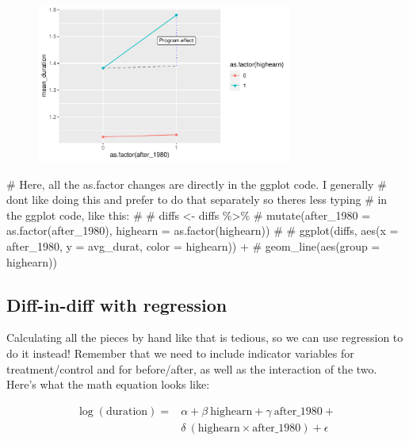 \documentclass[
  letterpaper,
  DIV=11,
  numbers=noendperiod]{scrartcl}
\newenvironment{Shaded}{\begin{snugshade}}{\end{snugshade}}
\newcommand{\CommentTok}[1]{\textcolor[rgb]{0.37,0.37,0.37}{#1}}
\begin{document}
\begin{figure}[H]

{\centering \includegraphics[width=0.75\textwidth,height=\textheight]{DD_wooldridge_injury_files/figure-pdf/nice-diff-diff-plot-1.pdf}

}

\end{figure}

\begin{Shaded}
\begin{Highlighting}[]

\CommentTok{\# Here, all the as.factor changes are directly in the ggplot code. I generally}
\CommentTok{\# don\textquotesingle{}t like doing this and prefer to do that separately so there\textquotesingle{}s less typing}
\CommentTok{\# in the ggplot code, like this:}
\CommentTok{\#}
\CommentTok{\# diffs \textless{}{-} diffs \%\textgreater{}\%}
\CommentTok{\#   mutate(after\_1980 = as.factor(after\_1980), highearn = as.factor(highearn))}
\CommentTok{\#}
\CommentTok{\# ggplot(diffs, aes(x = after\_1980, y = avg\_durat, color = highearn)) +}
\CommentTok{\#   geom\_line(aes(group = highearn))}
\end{Highlighting}
\end{Shaded}

\hypertarget{diff-in-diff-with-regression}{%
\subsection{Diff-in-diff with
regression}\label{diff-in-diff-with-regression}}

Calculating all the pieces by hand like that is tedious, so we can use
regression to do it instead! Remember that we need to include indicator
variables for treatment/control and for before/after, as well as the
interaction of the two. Here's what the math equation looks like:

\[
\begin{aligned}
\log(\text{duration}) = &\alpha + \beta \ \text{highearn} + \gamma \ \text{after_1980} + \\
& \delta \ (\text{highearn} \times \text{after_1980}) + \epsilon
\end{aligned}
\]
\end{document}
